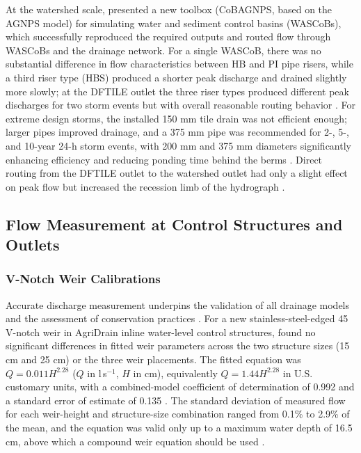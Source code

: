 \documentclass[11pt]{article}
\begin{document}
At the watershed scale, \textcite{Gupta2019} presented a new toolbox (CoBAGNPS, based on
the AGNPS model) for simulating water and sediment control basins (WASCoBs), which
successfully reproduced the required outputs and routed flow through WASCoBs and the
drainage network. For a single WASCoB, there was no substantial difference in flow
characteristics between HB and PI pipe risers, while a third riser type (HBS) produced a
shorter peak discharge and drained slightly more slowly; at the DFTILE outlet the three
riser types produced different peak discharges for two storm events but with overall
reasonable routing behavior \parencite{Gupta2019}. For extreme design storms, the installed
150 mm tile drain was not efficient enough; larger pipes improved drainage, and a 375 mm
pipe was recommended for 2-, 5-, and 10-year 24-h storm events, with 200 mm and 375 mm
diameters significantly enhancing efficiency and reducing ponding time behind the berms
\parencite{Gupta2019}. Direct routing from the DFTILE outlet to the watershed outlet had
only a slight effect on peak flow but increased the recession limb of the hydrograph
\parencite{Gupta2019}.

\subsection{Flow Measurement at Control Structures and Outlets}

\subsubsection{V-Notch Weir Calibrations}

Accurate discharge measurement underpins the validation of all drainage models and the
assessment of conservation practices \parencite{Christianson2019,Katuwal2024}. For a new
stainless-steel-edged 45\textdegree{} V-notch weir in AgriDrain inline water-level control
structures, \textcite{Christianson2019} found no significant differences in fitted weir
parameters across the two structure sizes (15 cm and 25 cm) or the three weir placements.
The fitted equation was $Q = 0.011 H^{2.28}$ ($Q$ in l\,s$^{-1}$, $H$ in cm), equivalently
$Q = 1.44 H^{2.28}$ in U.S. customary units, with a combined-model coefficient of
determination of 0.992 and a standard error of estimate of 0.135
\parencite{Christianson2019}. The standard deviation of measured flow for each weir-height
and structure-size combination ranged from 0.1\% to 2.9\% of the mean, and the equation was
valid only up to a maximum water depth of 16.5 cm, above which a compound weir equation
should be used \parencite{Christianson2019}.
\end{document}
